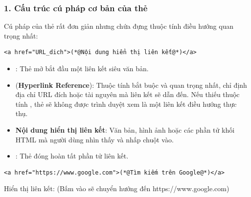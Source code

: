\subsubsection{1. Cấu trúc cú pháp cơ bản của thẻ }

Cú pháp của thẻ  rất đơn giản nhưng chứa đựng thuộc tính điều hướng quan trọng nhất:

\begin{codeWindow}
\begin{lstlisting}[language=HTML5]
<a href="URL_dich">(*@Nội dung hiển thị liên kết@*)</a>
\end{lstlisting}
\end{codeWindow}

\begin{conceptBox}
\begin{itemize}[leftmargin=1.5em, itemsep=3pt, parsep=0pt]
    \item {}: Thẻ mở bắt đầu một liên kết siêu văn bản.
    \item {} (\textbf{Hyperlink Reference}): Thuộc tính bắt buộc và quan trọng nhất, chỉ định địa chỉ URL đích hoặc tài nguyên mà liên kết sẽ dẫn đến. Nếu thiếu thuộc tính , thẻ  sẽ không được trình duyệt xem là một liên kết điều hướng thực thụ.
    \item \textbf{Nội dung hiển thị liên kết}: Văn bản, hình ảnh hoặc các phần tử khối HTML mà người dùng nhìn thấy và nhấp chuột vào.
    \item {}: Thẻ đóng hoàn tất phần tử liên kết.
\end{itemize}
\end{conceptBox}

\begin{codeWindow}
\begin{lstlisting}[language=HTML5]
<a href="https://www.google.com">(*@Tìm kiếm trên Google@*)</a>
\end{lstlisting}
\end{codeWindow}

\begin{tcolorbox}[
    enhanced, colback=white, colframe=primaryBlue!20, arc=6pt, boxrule=0.8pt, drop shadow=black!3!white,
    top=8pt, bottom=8pt, left=12pt, right=12pt,
    title={\sffamily\bfseries\scriptsize\color{codeComment} KẾT QUẢ HIỂN THỊ TRÊN TRÌNH DUYỆT (BROWSER PREVIEW)},
    coltitle=codeComment, colbacktitle=codeBg!80!white
]
Hiển thị liên kết: \underline{} \hfill \scriptsize\color{codeComment}(Bấm vào sẽ chuyển hướng đến https://www.google.com)
\end{tcolorbox}

